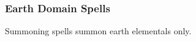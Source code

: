 \begin{spelllist}
    \SLburninghands[1]
    \SLshockinggrasp[1]
    \SLsoundburst[2]
    \SLlightningbolt[3]
    \SLscorchingray[3]
    \SLshout[3]
    \SLicestorm[4]
    \SLflamestrike[5]
    \SLchainlightning[6]
    \SLdisintegrate[6]
    \SLshoutgreater[6]
    \SLskysmite[6]
    \SLacidfog[7]
    \SLdestruction[7]
    \SLearthquake[8]
    \SLfirestorm[8]
    \SLimplosion[9]
    \SLmeteorswarm[9]
\end{spelllist}

\begin{comment}
\subsubsection{Dragon Domain Spells}

\begin{spelllist}
    \spellhead[1]{Burning Hands}\fn{1} 1d6 fire damage.
    \spellhead[1]{Command} One subject obeys selected command for 1 round.
    \spellhead[2]{Locate Object} Senses direction toward object (specific or type).
    \spellhead[3]{Lightning Bolt}\fn{1} Large line of electricity deals 3d8 damage.
    \spellhead[4]{Fly} Subject flies at speed of 60 ft.
    \spellhead[4]{Suggestion} Compels subject to follow stated course of action.
    \spellhead[5]{Command}[Mass] As \spell{command}, but affects multiple creatures.
    \spellhead[5]{Cone of Cold}\fn{1} 5d8 cold damage and brief slow in large cone.
    \spellhead[6]{Locate Entity} Locates creatures or objects within 1 mile.
    \spellhead[6]{True Seeing}\M Lets you see all things as they really are.
    \spellhead[7]{Overland Flight} You fly at a speed of 40 ft. and can hustle over long distances.
    \spellhead[7]{Power Word Blind} Blinds bloodied creature.
    \spellhead[8]{Power Word Stun} Stuns bloodied creature.
    \spellhead[8]{Suggestion}[Mass] As \spell{suggestion}, but shorter and affects multiple creatures.
    \spellhead[9]{Power Word Kill} Kills bloodied creature.
\end{spelllist}
1 Used as a breath attack, requiring no somatic components.
\end{comment}

\subsubsection{Earth Domain Spells}

\begin{spelllist}
    \SLearthspull[1]
    \SLearthspike[1]
    \SLtremorsense[1]
    \SLearthenblade[2]
    \SLmeldintostone[2]
    \SLearthglide[4]
    \SLearthspikemass[4]
    \SLstoneskin[4]
    \SLsummonmonsterv[4]
    \SLtransmutefleshandstone[6]
    \SLsummonmonsterviii[7]
    \SLearthquake[8]
    \SLimprisonment[8]
    \SLironbody[8]
\end{spelllist}
Summoning spells summon earth elementals only.

